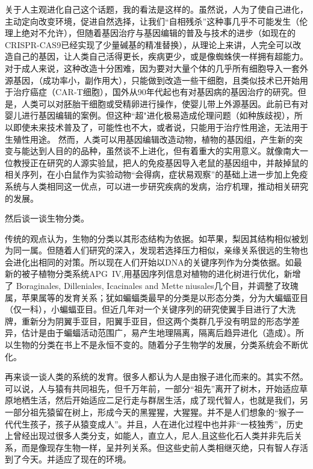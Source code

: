 \documentclass[UTF8]{ctexart}
\begin{document}
关于人主观进化自己这个话题，我的看法是这样的。虽然说，人为了使自己进化，主动定向改变环境，促进自然选择，让我们“自相残杀”这种事几乎不可能发生（伦理上绝对不允许），但随着基因治疗与基因编辑的普及与技术的进步（如现在的CRISPR-CAS9已经实现了少量碱基的精准替换），从理论上来讲，人完全可以改造自己的基因，让人类自己活得更长，疾病更少，或是像蜘蛛侠一样拥有超能力。对于成人来说，这种改造十分困难，因为要对大量个体的几乎所有细胞导入一套外源基因，（成功率小，副作用大），只能做到改造一些干细胞，且类似技术已开始用于治疗癌症（CAR-T细胞），国外从90年代起也有对基因病的基因治疗的研究。但是，人类可以对胚胎干细胞或受精卵进行操作，使婴儿带上外源基因。此前已有对婴儿进行基因编辑的案例。但这种“超"进化极易造成伦理问题（如种族歧视），所以即使未来技术普及了，可能性也不大，或者说，只能用于治疗性用途，无法用于生殖性用途。 然而，人类可以用基因编辑改造动物，植物的基因组，产生新的突变与能达到人目的的品种，虽然谈不上进化，但有着重大的实用意义。就像南大一位教授正在研究的人源实验鼠，把人的免疫基因导入老鼠的基因组中，并敲掉鼠的相关序列，在小白鼠作为实验动物“会得病，症状易观察”的基础上进一步加上免疫系统与人类相同这一优点，可以进一步研究疾病的发病，治疗机理，推动相关研究的发展。\par
然后谈一谈生物分类。\par
传统的观点认为，生物的分类以其形态结构为依据。如苹果，梨因其结构相似被划为同一属。但随着人们研究的深入，发现若选择压力相似，亲缘关系很远的生物也会进化出相同的对策。所以现在人们开始以DNA的关键序列作为分类依据。如最新的被子植物分类系统APG\ IV,用基因序列信息对植物的进化树进行优化，新增了 Boraginales, Dilleniales, Icacinales and Metteniusales几个目，并调整了玫瑰属，苹果属等的发育关系；犹如蝙蝠类最早的分类是以形态分类，分为大蝙蝠亚目（仅一科），小蝙蝠亚目。但近几年对一个关键序列的研究使翼手目进行了大洗牌，重新分为阴翼手亚目，阳翼手亚目，但这两个类群几乎没有明显的形态学差异，估计是由于蝙蝠活动范围广，易产生地理隔离，隔离后趋异进化（造成）。所以生物的分类在书上不是永恒不变的。随着分子生物学的发展，分类系统会不断优化。\par
再来谈一谈人类的系统的发育。很多人都认为人是由猴子进化而来的。其实不然。可以说，人与猿有共同祖先，但千万年前，一部分“祖先”离开了树木，开始适应草原地栖生活，然后开始适应二足行走与群居生活，成了现代智人，也就是我们，另一部分祖先猿留在树上，形成今天的黑猩猩，大猩猩。并不是人们想象的“猴子一代代生孩子，孩子从猿变成人”。并且，人在进化过程中也并非“一枝独秀”，历史上曾经出现过很多人类分支，如能人，直立人，尼人,且这些化石人类并非先后关系，而是像现存生物一样，呈并列关系。但这些史前人类相继灭绝，只有智人存活到了今天。并适应了现在的环境。
\end{document}
